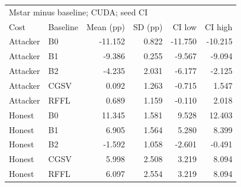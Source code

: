 \begin{tabular}{llrrrr}
\toprule
\multicolumn{6}{l}{Mstar minus baseline; CUDA; seed CI} \\
Cost & Baseline & Mean (pp) & SD (pp) & CI low & CI high \\
\midrule
Attacker & B0 & -11.152 & 0.822 & -11.750 & -10.215 \\
Attacker & B1 & -9.386 & 0.255 & -9.567 & -9.094 \\
Attacker & B2 & -4.235 & 2.031 & -6.177 & -2.125 \\
Attacker & CGSV & 0.092 & 1.263 & -0.715 & 1.547 \\
Attacker & RFFL & 0.689 & 1.159 & -0.110 & 2.018 \\
Honest & B0 & 11.345 & 1.581 & 9.528 & 12.403 \\
Honest & B1 & 6.905 & 1.564 & 5.280 & 8.399 \\
Honest & B2 & -1.592 & 1.058 & -2.601 & -0.491 \\
Honest & CGSV & 5.998 & 2.508 & 3.219 & 8.094 \\
Honest & RFFL & 6.097 & 2.554 & 3.219 & 8.094 \\
\bottomrule
\end{tabular}
